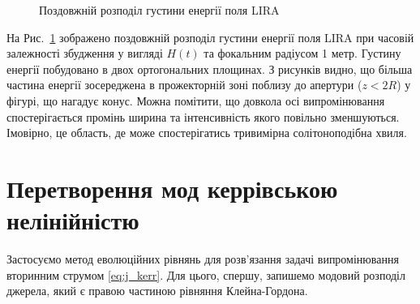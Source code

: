 \begin{figure}
\caption{Поздовжній розподіл густини енергії поля LIRA}
\label{fig:long_dist}
\end{figure}

На Рис.~\ref{fig:long_dist} зображено поздовжній розподіл густини енергії 
поля LIRA при часовій залежності збудження у вигляді $ H(t) $ та фокальним 
радіусом 1 метр. Густину енергії побудовано в двох ортогональних площинах.
З рисунків видно, що більша частина енергії зосереджена в прожекторній зоні 
поблизу до апертури ($ z < 2R $) у фігурі, що нагадує конус. Можна помітити, 
що довкола осі випромінювання спостерігається промінь ширина та інтенсивність 
якого повільно зменшуються. Імовірно, це область, де може спостерігатись 
тривимірна солітоноподібна хвиля.


\section{Перетворення мод керрівською нелінійністю}

Застосуємо метод еволюційних рівнянь для розв'язання задачі випромінювання 
вторинним струмом \eqref{eq:j_kerr}. Для цього, спершу, запишемо модовий
розподіл джерела, який є правою частиною рівняння Клейна-Гордона. 

%
%
%

